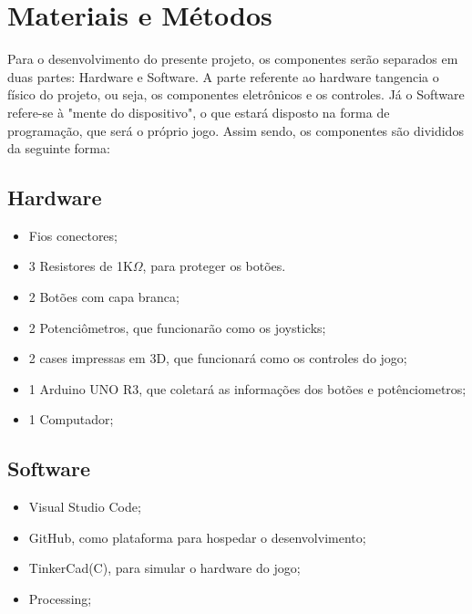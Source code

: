 \section{Materiais e Métodos}

Para o desenvolvimento do presente projeto, os componentes serão separados em duas partes: Hardware e Software.
	A parte referente ao hardware tangencia o físico do projeto, ou seja, os componentes eletrônicos e os controles. Já o Software refere-se à "mente do dispositivo", o que estará disposto na forma de programação, que será o próprio jogo. Assim sendo, os componentes são divididos da seguinte forma:
	
\subsection{Hardware}
\begin{itemize}
\item Fios conectores;
\item 3 Resistores de 1K$\Omega$, para proteger os botões. 
\item 2 Botões com capa branca;
\item 2 Potenciômetros, que funcionarão como os joysticks;
\item 2 cases impressas em 3D, que funcionará como os controles do jogo;
\item 1 Arduino UNO R3, que coletará as informações dos botões e potênciometros;
\item 1 Computador; \vspace*{0.5cm}
\end{itemize}

\subsection{Software}
\begin{itemize}
\item Visual Studio Code;
\item GitHub, como plataforma para hospedar o desenvolvimento;
\item TinkerCad(C), para simular o hardware do jogo;
\item Processing; 
\end{itemize}